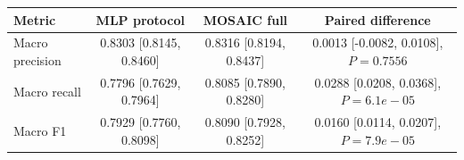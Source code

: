 \begin{tabular}{lccc}
\toprule
Metric & MLP protocol & MOSAIC full & Paired difference \\
\midrule
Macro precision & 0.8303 [0.8145, 0.8460] & 0.8316 [0.8194, 0.8437] & 0.0013 [-0.0082, 0.0108], $P=0.7556$ \\
Macro recall & 0.7796 [0.7629, 0.7964] & 0.8085 [0.7890, 0.8280] & 0.0288 [0.0208, 0.0368], $P=6.1e-05$ \\
Macro F1 & 0.7929 [0.7760, 0.8098] & 0.8090 [0.7928, 0.8252] & 0.0160 [0.0114, 0.0207], $P=7.9e-05$ \\
\bottomrule
\end{tabular}
